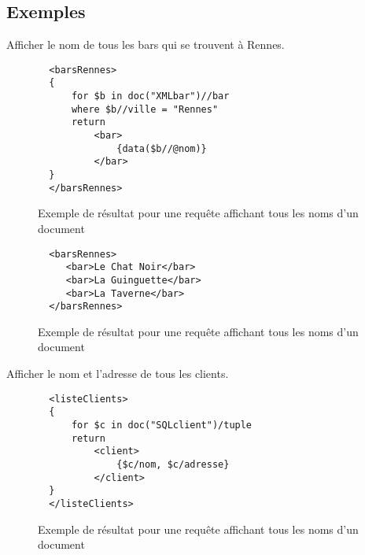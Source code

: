 \documentclass[a4paper,10pt]{article}
\begin{document}
\subsection{Exemples}

Afficher le nom de tous les bars qui se trouvent à Rennes.

\begin{figure}[ht!]
\begin{verbatim}
  <barsRennes>
  {
      for $b in doc("XMLbar")//bar
      where $b//ville = "Rennes"
      return		
          <bar>
              {data($b//@nom)}
          </bar>		
  }
  </barsRennes>
\end{verbatim}
\caption{Exemple de résultat pour une requête affichant tous les noms d'un document}
\label{lst:requeteTest1}
\end{figure}

\begin{figure}[ht!]
\begin{verbatim}
  <barsRennes>
     <bar>Le Chat Noir</bar>
     <bar>La Guinguette</bar>
     <bar>La Taverne</bar>
  </barsRennes>
\end{verbatim}
\caption{Exemple de résultat pour une requête affichant tous les noms d'un document}
\label{lst:resultatTest1}
\end{figure}


Afficher le nom et l'adresse de tous les clients.

\begin{figure}[ht!]
\begin{verbatim}
  <listeClients>
  {
      for $c in doc("SQLclient")/tuple
      return		
          <client>
              {$c/nom, $c/adresse}
          </client>		
  }
  </listeClients>
\end{verbatim}
\caption{Exemple de résultat pour une requête affichant tous les noms d'un document}
\label{lst:requeteTest2}
\end{figure}
\end{document}
